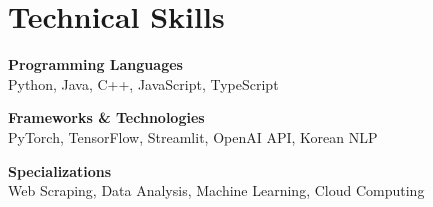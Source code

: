 \documentclass[11pt,a4paper]{article}
\begin{document}
\section{Technical Skills}

\textbf{Programming Languages}\\
Python, Java, C++, JavaScript, TypeScript

\vspace{0.5em}
\textbf{Frameworks \& Technologies}\\
PyTorch, TensorFlow, Streamlit, OpenAI API, Korean NLP

\vspace{0.5em}
\textbf{Specializations}\\
Web Scraping, Data Analysis, Machine Learning, Cloud Computing
\end{document}
